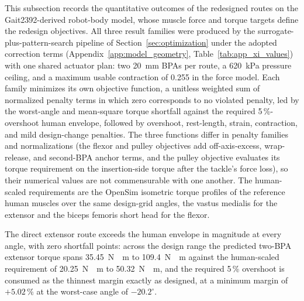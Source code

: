 This subsection records the quantitative outcomes of the redesigned routes on the Gait2392-derived robot-body model, whose muscle force and torque targets define the redesign objectives. All three result families were produced by the surrogate-plus-pattern-search pipeline of Section~\ref{sec:optimization} under the adopted correction terms (Appendix~\ref{app:model_geometry}, Table~\ref{tab:app_xi_values}) with one shared actuator plan: two \qty{20}{\mm} BPAs per route, a \qty{620}{\kPa} pressure ceiling, and a maximum usable contraction of 0.255 in the force model. Each family minimizes its own objective function, a unitless weighted sum of normalized penalty terms in which zero corresponds to no violated penalty, led by the worst-angle and mean-square torque shortfall against the required 5\,\%-overshoot human envelope, followed by overshoot, rest-length, strain, contraction, and mild design-change penalties. The three functions differ in penalty families and normalizations (the flexor and pulley objectives add off-axis-excess, wrap-release, and second-BPA anchor terms, and the pulley objective evaluates its torque requirement on the insertion-side torque after the tackle's force loss), so their numerical values are not commensurable with one another. The human-scaled requirements are the OpenSim isometric torque profiles of the reference human muscles over the same design-grid angles, the vastus medialis for the extensor and the biceps femoris short head for the flexor.

The direct extensor route exceeds the human envelope in magnitude at every angle, with zero shortfall points: across the design range the predicted two-BPA extensor torque spans \qty{35.45}{\newton\cdot\meter} to \qty{109.4}{\newton\cdot\meter} against the human-scaled requirement of \qty{20.25}{\newton\cdot\meter} to \qty{50.32}{\newton\cdot\meter}, and the required 5\,\% overshoot is consumed as the thinnest margin exactly as designed, at a minimum margin of $+5.02$\,\% at the worst-case angle of $-20.2^{\circ}$.

